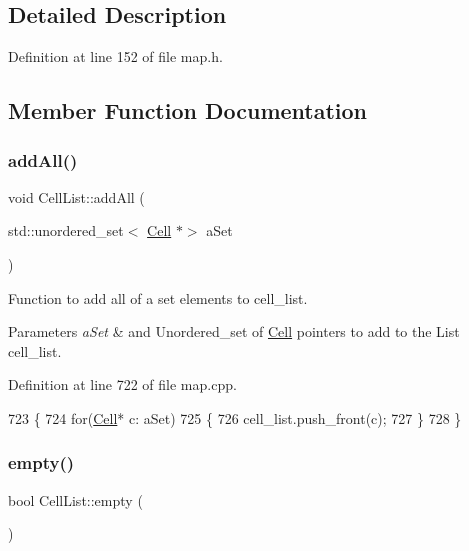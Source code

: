 \subsection{Detailed Description}


Definition at line 152 of file map.\+h.



\subsection{Member Function Documentation}
\hypertarget{class_cell_list_a94857958e9f2156c7b4c76fd774a5fda}{}\label{class_cell_list_a94857958e9f2156c7b4c76fd774a5fda} 
\subsubsection{\texorpdfstring{add\+All()}{addAll()}}
{\footnotesize\ttfamily void Cell\+List\+::add\+All (\begin{DoxyParamCaption}\item[{std\+::unordered\+\_\+set$<$ \hyperlink{class_cell}{Cell} $\ast$$>$}]{a\+Set }\end{DoxyParamCaption})}



Function to add all of a set elements to cell\+\_\+list. 


\begin{DoxyParams}{Parameters}
{\em a\+Set} & and Unordered\+\_\+set of \hyperlink{class_cell}{Cell} pointers to add to the List cell\+\_\+list. \\
\hline
\end{DoxyParams}


Definition at line 722 of file map.\+cpp.


\begin{DoxyCode}
723 \{
724     \textcolor{keywordflow}{for}(\hyperlink{class_cell}{Cell}* c: aSet)
725     \{
726         cell\_list.push\_front(c);
727     \}
728 \}
\end{DoxyCode}
\hypertarget{class_cell_list_a5df3e74d57494b51859a6a223f8b2a30}{}\label{class_cell_list_a5df3e74d57494b51859a6a223f8b2a30} 
\subsubsection{\texorpdfstring{empty()}{empty()}}
{\footnotesize\ttfamily bool Cell\+List\+::empty (\begin{DoxyParamCaption}{ }\end{DoxyParamCaption})}



